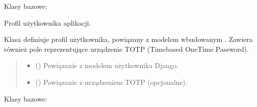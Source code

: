 \documentclass[letterpaper,10pt,polish]{sphinxmanual}
\begin{document}
\begin{fulllineitems}
\label{\detokenize{mainApp:mainApp.models.UserProfile}}
\pysigstartsignatures
{}
\pysigstopsignatures
\sphinxAtStartPar
Klasy bazowe: 

\sphinxAtStartPar
Profil użytkownika aplikacji.

\sphinxAtStartPar
Klasa  definiuje profil użytkownika, powiązany z modelem wbudowanym .
Zawiera również pole  reprezentujące urządzenie TOTP (Time\sphinxhyphen{}based One\sphinxhyphen{}Time Password).
\begin{quote}\begin{description}
\begin{itemize}
\item {} 
\sphinxAtStartPar
{} () \textendash{} Powiązanie z modelem użytkownika Django.

\item {} 
\sphinxAtStartPar
{} () \textendash{} Powiązanie z urządzeniem TOTP (opcjonalne).

\end{itemize}

\end{description}\end{quote}

\begin{fulllineitems}
\label{\detokenize{mainApp:mainApp.models.UserProfile.DoesNotExist}}
\pysigstartsignatures
{}
\pysigstopsignatures
\sphinxAtStartPar
Klasy bazowe: 

\end{fulllineitems}



\end{fulllineitems}
\end{document}
